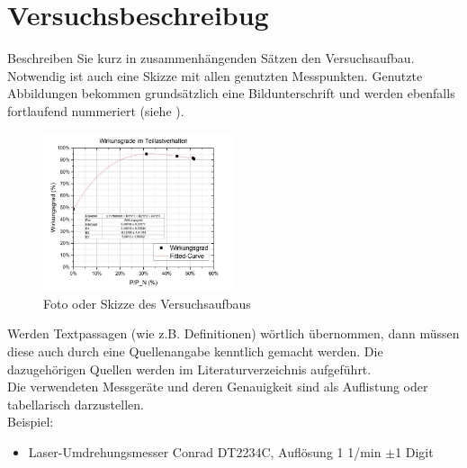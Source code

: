 \section{Versuchsbeschreibug}
\label{section:Versuchsbeschreibung}
Beschreiben Sie kurz in zusammenhängenden Sätzen den Versuchsaufbau. Notwendig ist auch eine Skizze mit allen genutzten Messpunkten. Genutzte Abbildungen bekommen grundsätzlich eine Bildunterschrift und werden ebenfalls fortlaufend nummeriert (siehe ).\\

%
\begin{figure}[!h]
		\centering
		\includegraphics[width=0.5\textwidth]{Abbildungen/Kennlinie wr}
		\caption{Foto oder Skizze des Versuchsaufbaus \cite{SPM20}}
		\label{fig:BspVers}
\end{figure}
%
Werden Textpassagen (wie z.B. Definitionen) wörtlich übernommen, dann müssen diese auch durch eine Quellenangabe kenntlich gemacht werden. Die dazugehörigen Quellen werden im Literaturverzeichnis aufgeführt.\\

Die verwendeten Messgeräte und deren Genauigkeit sind als Auflistung oder tabellarisch darzustellen.\\

Beispiel:
%
\begin{itemize}
\item Laser-Umdrehungsmesser Conrad DT2234C, Auflösung 1 1/min $\pm$1 Digit
\end{itemize}
%
